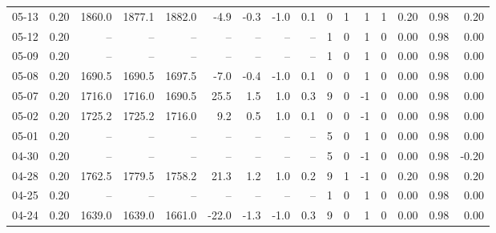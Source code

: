 \begin{threeparttable}
{\begin{tabular}{lrrrrrrrrrrrrrrr}
  05-13 &     0.20 & 1860.0 & 1877.1 & 1882.0 &       -4.9 &           -0.3 &                     -1.0 &                 0.1 &              0 &         1 &     1 &         1 &       0.20 &      0.98 &           0.20 \\
  05-12 &     0.20 &     -- &     -- &     -- &         -- &             -- &                       -- &                  -- &              1 &         0 &     1 &         0 &       0.00 &      0.98 &           0.00 \\
  05-09 &     0.20 &     -- &     -- &     -- &         -- &             -- &                       -- &                  -- &              1 &         0 &     1 &         0 &       0.00 &      0.98 &           0.00 \\
  05-08 &     0.20 & 1690.5 & 1690.5 & 1697.5 &       -7.0 &           -0.4 &                     -1.0 &                 0.1 &              0 &         0 &     1 &         0 &       0.00 &      0.98 &           0.00 \\
  05-07 &     0.20 & 1716.0 & 1716.0 & 1690.5 &       25.5 &            1.5 &                      1.0 &                 0.3 &              9 &         0 &    -1 &         0 &       0.00 &      0.98 &           0.00 \\
  05-02 &     0.20 & 1725.2 & 1725.2 & 1716.0 &        9.2 &            0.5 &                      1.0 &                 0.1 &              0 &         0 &    -1 &         0 &       0.00 &      0.98 &           0.00 \\
  05-01 &     0.20 &     -- &     -- &     -- &         -- &             -- &                       -- &                  -- &              5 &         0 &     1 &         0 &       0.00 &      0.98 &           0.00 \\
  04-30 &     0.20 &     -- &     -- &     -- &         -- &             -- &                       -- &                  -- &              5 &         0 &    -1 &         0 &       0.00 &      0.98 &          -0.20 \\
  04-28 &     0.20 & 1762.5 & 1779.5 & 1758.2 &       21.3 &            1.2 &                      1.0 &                 0.2 &              9 &         1 &    -1 &         0 &       0.20 &      0.98 &           0.20 \\
  04-25 &     0.20 &     -- &     -- &     -- &         -- &             -- &                       -- &                  -- &              1 &         0 &     1 &         0 &       0.00 &      0.98 &           0.00 \\
  04-24 &     0.20 & 1639.0 & 1639.0 & 1661.0 &      -22.0 &           -1.3 &                     -1.0 &                 0.3 &              9 &         0 &     1 &         0 &       0.00 &      0.98 &           0.00 \\

\end{tabular}}
\end{threeparttable}
